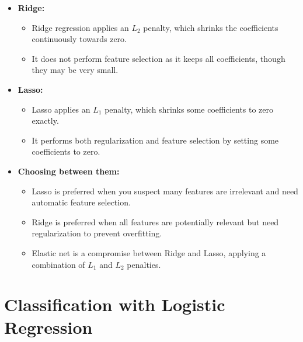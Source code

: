 \documentclass{article}
\begin{document}
\begin{itemize}
    \item \textbf{Ridge:}
    \begin{itemize}
        \item Ridge regression applies an $L_2$ penalty, which shrinks the coefficients continuously towards zero.
        \item It does not perform feature selection as it keeps all coefficients, though they may be very small.
    \end{itemize}
    
    \item \textbf{Lasso:}
    \begin{itemize}
        \item Lasso applies an $L_1$ penalty, which shrinks some coefficients to zero exactly.
        \item It performs both regularization and feature selection by setting some coefficients to zero.
    \end{itemize}
    
    \item \textbf{Choosing between them:}
    \begin{itemize}
        \item Lasso is preferred when you suspect many features are irrelevant and need automatic feature selection.
        \item Ridge is preferred when all features are potentially relevant but need regularization to prevent overfitting.
        \item Elastic net is a compromise between Ridge and Lasso, applying a combination of $L_1$ and $L_2$ penalties.
    \end{itemize}
\end{itemize}

\section{Classification with Logistic Regression}
\end{document}
